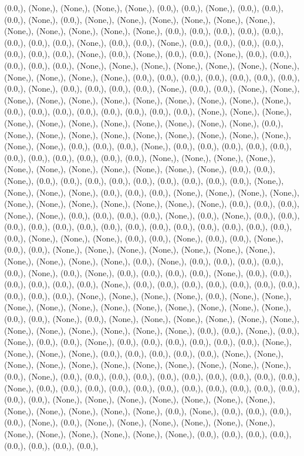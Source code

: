 \documentclass{article}
\begin{document}
(0.0,), (None,), (None,), (None,), (None,), (0.0,), (0.0,), (None,), (0.0,), (0.0,), (0.0,), (None,), (0.0,), (None,), (None,), (None,), (None,), (None,), (None,), (None,), (None,), (None,), (None,), (None,), (0.0,), (0.0,), (0.0,), (0.0,), (0.0,), (0.0,), (0.0,), (0.0,), (None,), (0.0,), (0.0,), (None,), (0.0,), (0.0,), (0.0,), (0.0,), (0.0,), (0.0,), (0.0,), (None,), (0.0,), (None,), (0.0,), (0.0,), (None,), (0.0,), (0.0,), (0.0,), (0.0,), (0.0,), (None,), (None,), (None,), (None,), (None,), (None,), (None,), (None,), (None,), (None,), (None,), (0.0,), (0.0,), (0.0,), (0.0,), (0.0,), (0.0,), (0.0,), (0.0,), (None,), (0.0,), (0.0,), (0.0,), (0.0,), (None,), (0.0,), (0.0,), (None,), (None,), (None,), (None,), (None,), (None,), (None,), (None,), (None,), (None,), (None,), (0.0,), (0.0,), (0.0,), (0.0,), (0.0,), (0.0,), (0.0,), (0.0,), (None,), (None,), (None,), (None,), (None,), (None,), (None,), (None,), (None,), (None,), (None,), (0.0,), (None,), (None,), (None,), (None,), (None,), (None,), (None,), (None,), (None,), (None,), (None,), (0.0,), (0.0,), (0.0,), (None,), (0.0,), (0.0,), (0.0,), (0.0,), (0.0,), (0.0,), (0.0,), (0.0,), (0.0,), (0.0,), (0.0,), (None,), (None,), (None,), (None,), (None,), (None,), (None,), (None,), (None,), (None,), (None,), (0.0,), (0.0,), (None,), (0.0,), (0.0,), (0.0,), (0.0,), (0.0,), (0.0,), (0.0,), (0.0,), (0.0,), (None,), (None,), (None,), (None,), (0.0,), (0.0,), (0.0,), (None,), (None,), (None,), (None,), (None,), (None,), (None,), (None,), (None,), (None,), (None,), (0.0,), (0.0,), (0.0,), (None,), (None,), (0.0,), (0.0,), (0.0,), (0.0,), (None,), (0.0,), (None,), (0.0,), (0.0,), (0.0,), (0.0,), (0.0,), (0.0,), (0.0,), (0.0,), (0.0,), (0.0,), (0.0,), (0.0,), (0.0,), (0.0,), (0.0,), (None,), (None,), (None,), (0.0,), (0.0,), (None,), (0.0,), (0.0,), (None,), (0.0,), (0.0,), (None,), (None,), (None,), (None,), (None,), (None,), (None,), (None,), (None,), (None,), (None,), (0.0,), (None,), (0.0,), (0.0,), (0.0,), (0.0,), (0.0,), (None,), (0.0,), (None,), (0.0,), (0.0,), (0.0,), (0.0,), (None,), (0.0,), (0.0,), (0.0,), (0.0,), (0.0,), (0.0,), (None,), (0.0,), (0.0,), (0.0,), (0.0,), (0.0,), (0.0,), (0.0,), (0.0,), (0.0,), (0.0,), (None,), (None,), (None,), (None,), (0.0,), (None,), (None,), (None,), (None,), (None,), (None,), (None,), (None,), (None,), (None,), (None,), (0.0,), (0.0,), (None,), (0.0,), (None,), (None,), (None,), (None,), (None,), (None,), (None,), (None,), (None,), (None,), (None,), (None,), (0.0,), (0.0,), (None,), (0.0,), (None,), (0.0,), (0.0,), (None,), (0.0,), (0.0,), (0.0,), (0.0,), (0.0,), (0.0,), (None,), (None,), (None,), (None,), (0.0,), (0.0,), (0.0,), (0.0,), (0.0,), (None,), (None,), (None,), (None,), (None,), (None,), (None,), (None,), (None,), (None,), (None,), (0.0,), (None,), (0.0,), (0.0,), (0.0,), (0.0,), (0.0,), (0.0,), (0.0,), (0.0,), (0.0,), (0.0,), (None,), (0.0,), (0.0,), (0.0,), (0.0,), (0.0,), (0.0,), (0.0,), (0.0,), (0.0,), (0.0,), (0.0,), (0.0,), (0.0,), (None,), (None,), (None,), (None,), (None,), (None,), (None,), (None,), (None,), (None,), (None,), (None,), (0.0,), (None,), (0.0,), (0.0,), (0.0,), (0.0,), (None,), (0.0,), (None,), (None,), (None,), (None,), (None,), (None,), (None,), (None,), (None,), (None,), (None,), (None,), (0.0,), (0.0,), (0.0,), (0.0,), (0.0,), (0.0,), (0.0,), (0.0,), 
\end{document}
